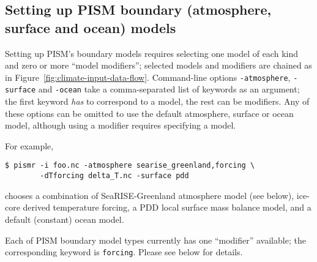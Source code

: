\subsection{Setting up PISM boundary (atmosphere, surface and ocean) models}
\label{sec:boundary-models}

Setting up PISM's boundary models requires selecting one model of each kind and zero or more ``model modifiers''; selected models and modifiers are chained as in Figure~\ref{fig:climate-input-data-flow}. Command-line options \texttt{-atmosphere}, \texttt{-surface} and \texttt{-ocean} take a comma-separated list of keywords as an argument; the first keyword \emph{has} to correspond to a model, the rest can be modifiers. Any of these options can be omitted to use the default atmosphere, surface or ocean model, although using a modifier requires specifying a model.

For example,
\begin{verbatim}
$ pismr -i foo.nc -atmosphere searise_greenland,forcing \
        -dTforcing delta_T.nc -surface pdd
\end{verbatim}%
chooses a combination of SeaRISE-Greenland atmosphere model (see below),  ice-core derived temperature forcing, a PDD local surface mass balance model, and a default (constant) ocean model.

Each of PISM boundary model types currently has one ``modifier'' available; the corresponding keyword is \texttt{forcing}. Please see below for details.

